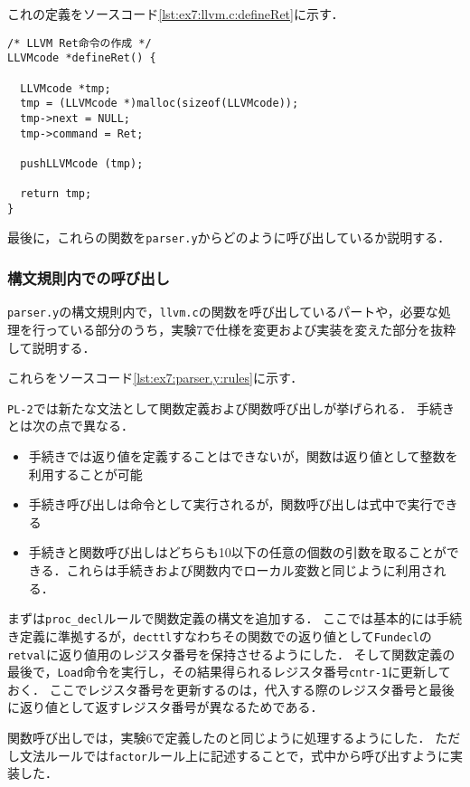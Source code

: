 \documentclass[uplatex]{jsarticle}
\begin{document}
これの定義をソースコード\ref{lst:ex7:llvm.c:defineRet}に示す．

\begin{lstlisting}[caption=defineCall関数の定義,label=lst:ex7:llvm.c:defineRet]
/* LLVM Ret命令の作成 */
LLVMcode *defineRet() {

  LLVMcode *tmp;
  tmp = (LLVMcode *)malloc(sizeof(LLVMcode));
  tmp->next = NULL;
  tmp->command = Ret;

  pushLLVMcode (tmp);

  return tmp;
}
\end{lstlisting}

最後に，これらの関数を\verb#parser.y#からどのように呼び出しているか説明する．

\subsubsection{構文規則内での呼び出し}

\verb#parser.y#の構文規則内で，\verb#llvm.c#の関数を呼び出しているパートや，必要な処理を行っている部分のうち，実験7で仕様を変更および実装を変えた部分を抜粋して説明する．

これらをソースコード\ref{lst:ex7:parser.y:rules}に示す．

\verb#PL-2#では新たな文法として関数定義および関数呼び出しが挙げられる．
手続きとは次の点で異なる．
\begin{itemize}
  \item {手続きでは返り値を定義することはできないが，関数は返り値として整数を利用することが可能}
  \item {手続き呼び出しは命令として実行されるが，関数呼び出しは式中で実行できる}
  \item {手続きと関数呼び出しはどちらも10以下の任意の個数の引数を取ることができる．これらは手続きおよび関数内でローカル変数と同じように利用される．}
\end{itemize}

まずは\verb#proc_decl#ルールで関数定義の構文を追加する．
ここでは基本的には手続き定義に準拠するが，\verb#decttl#すなわちその関数での返り値として\verb#Fundecl#の\verb#retval#に返り値用のレジスタ番号を保持させるようにした．
そして関数定義の最後で，\verb#Load#命令を実行し，その結果得られるレジスタ番号\verb#cntr-1#に更新しておく．
ここでレジスタ番号を更新するのは，代入する際のレジスタ番号と最後に返り値として返すレジスタ番号が異なるためである．

関数呼び出しでは，実験6で定義したのと同じように処理するようにした．
ただし文法ルールでは\verb#factor#ルール上に記述することで，式中から呼び出すように実装した．
\end{document}
